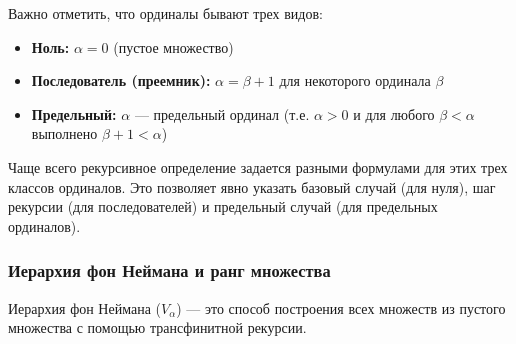 \documentclass[11pt, a4paper]{extarticle}
\newcommand{\al}{\alpha}
\newcommand{\be}{\beta}
\begin{document}
Важно отметить, что ординалы бывают трех видов:
\begin{itemize}
    \item \textbf{Ноль:} $\al = 0$ (пустое множество)
    \item \textbf{Последователь (преемник):} $\al = \be + 1$ для некоторого ординала $\be$
    \item \textbf{Предельный:} $\al$ — предельный ординал (т.е. $\al > 0$ и для любого $\be < \al$ выполнено $\be + 1 < \al$)
\end{itemize}

Чаще всего рекурсивное определение задается разными формулами для этих трех классов ординалов. Это позволяет явно указать базовый случай (для нуля), шаг рекурсии (для последователей) и предельный случай (для предельных ординалов).

\subsubsection{Иерархия фон Неймана и ранг множества}

Иерархия фон Неймана ($V_\al$) — это способ построения всех множеств из пустого множества с помощью трансфинитной рекурсии.
\end{document}
